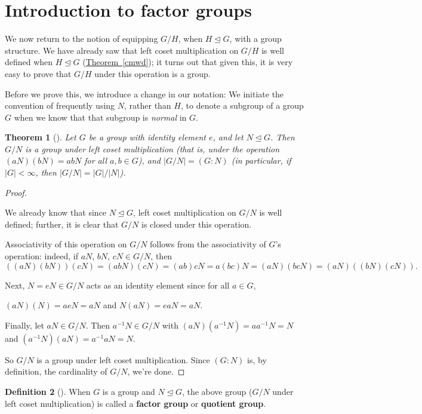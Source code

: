 \documentclass[10pt,]{book}
\newcommand{\terminology}[1]{\textbf{#1}}
\theoremstyle{plain}
\newtheorem{theorem}{Theorem}[section]
\theoremstyle{definition}
\newtheorem{definition}[theorem]{Definition}
\theoremstyle{definition}
\theoremstyle{definition}
\theoremstyle{definition}
\numberwithin{equation}{section}
\newcommand{\lt}{<}
\begin{document}
\section[{Introduction to factor groups}]{Introduction to factor groups}\label{section-27}
We now return to the notion of equipping \(G/H\), when \(H\unlhd G\), with a group structure. We have already saw that left coset multiplication on \(G/H\) is well defined when \(H\unlhd G\) (\hyperref[cmwd]{Theorem~\ref{cmwd}}); it turns out that given this, it is very easy to prove that \(G/H\) under this operation is a group.%
\par
Before we prove this, we introduce a change in our notation: We initiate the convention of frequently using \(N\), rather than \(H\), to denote a subgroup of a group \(G\) when we know that that subgroup is \emph{normal} in \(G\).%
\begin{theorem}[{}]\label{theorem-53}
Let \(G\) be a group with identity element \(e\), and let \(N\unlhd G\). Then \(G/N\) is a group under left coset multiplication (that is, under the operation \((aN)(bN)=abN\) for all \(a,b\in G\)), and \(|G/N|=(G:N)\) (in particular, if \(|G|\lt \infty\), then \(|G/N|=|G|/|N|\)).%
\end{theorem}
\begin{proof}\hypertarget{proof-46}{}
We already know that since \(N\unlhd G\), left coset multiplication on \(G/N\) is well defined; further, it is clear that \(G/N\) is closed under this operation.%
\par
Associativity of this operation on \(G/N\) follows from the associativity of \(G\)'s operation: indeed, if \(aN\), \(bN\), \(cN \in
G/N\), then%
\begin{equation*}
((aN)(bN))(cN)=(abN)(cN)=(ab)cN=a(bc)N=(aN)(bcN)=(aN)((bN)(cN)).
\end{equation*}
%
\par
Next, \(N=eN\in G/N\) acts as an identity element since for all \(a\in
G\),%
\par
\((aN)(N)=aeN=aN\) and \(N(aN)=eaN=aN\).%
\par
Finally, let \(aN\in G/N\). Then \(a^{-1}N\in G/N\) with \((aN)(a^{-1}N)=aa^{-1}N=N\) and \((a^{-1}N)(aN)=a^{-1}aN=N\).%
\par
So \(G/N\) is a group under left coset multiplication. Since \((G:N)\) is, by definition, the cardinality of \(G/N\), we're done.%
\end{proof}
\begin{definition}[{}]\label{definition-66}
When \(G\) is a group and \(N\unlhd G\), the above group (\(G/N\) under left coset multiplication) is called a \terminology{factor group} or \terminology{quotient group}.%
\end{definition}
\end{document}
